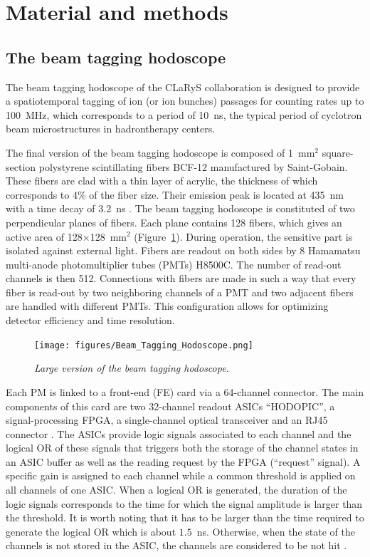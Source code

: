 \documentclass[a4paper,11pt]{article}
\begin{document}
\section{Material and methods}
\subsection{The beam tagging hodoscope}
\label{sec:hodo}

The beam tagging hodoscope of the CLaRyS collaboration is designed to provide a spatiotemporal tagging of ion (or ion bunches) passages for counting rates up to 100~MHz, which corresponds to a period of 10~ns, the typical period of cyclotron beam microstructures in hadrontherapy centers. 

The final version of the beam tagging hodoscope is composed  of 1~mm$^{2}$ square-section polystyrene scintillating fibers BCF-12 manufactured by Saint-Gobain. These fibers are clad with a thin layer of acrylic, the thickness of which corresponds to 4\% of the fiber size. Their emission peak is located at 435~nm with a time decay of 3.2~ns \cite{SaintGobain2017}.
The beam tagging hodoscope is constituted of two perpendicular planes of fibers. Each plane contains 128 fibers, which gives an active area of 128$\times$128~mm$^{2}$ (Figure~\ref{fig:hodoscope}). During operation, the sensitive part is isolated against external light. Fibers are readout on both sides by 8 Hamamatsu multi-anode photomultiplier tubes (PMTs) H8500C. The number of read-out channels is then 512. Connections with fibers are made in such a way that every fiber is read-out by two neighboring channels of a PMT and two adjacent fibers are handled with different PMTs. This configuration allows for optimizing detector efficiency and time resolution. 

\begin{figure}[htb]
\centering
\texttt{[image: figures/Beam\_Tagging\_Hodoscope.png]}
\caption{\small{\textit{Large version of the beam tagging hodoscope.}}}
\label{fig:hodoscope}
\end{figure}

Each PM is linked to a front-end (FE) card via a 64-channel connector. The main components of this card are two 32-channel readout ASICs \enquote{HODOPIC}, a signal-processing FPGA, a single-channel optical transceiver and an RJ45 connector \cite{Chen2019}. The ASICs provide logic signals associated to each channel and the logical OR of these signals that triggers both the storage of the channel states in an ASIC buffer as well as the reading request by the FPGA (\enquote{request} signal). A specific gain is assigned to each channel while a common threshold is applied on all channels of one ASIC. When a logical OR is generated, the duration of the logic signals corresponds to the time for which the signal amplitude is larger than the threshold. It is worth noting that it has to be larger than the time required to generate the logical OR which is about $1.5$~ns. Otherwise, when the state of the channels is not stored in the ASIC, the channels are considered to be not hit .
\end{document}
